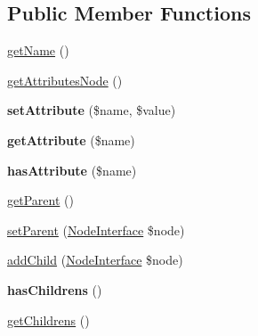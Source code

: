 \subsection*{Public Member Functions}
\begin{DoxyCompactItemize}
\item 
\mbox{\hyperlink{interface_pes_1_1_dom_1_1_node_1_1_node_interface_a3d0963e68bb313b163a73f2803c64600}{get\+Name}} ()
\item 
\mbox{\hyperlink{interface_pes_1_1_dom_1_1_node_1_1_node_interface_a4722e7722b245351681b05d35f6694f3}{get\+Attributes\+Node}} ()
\item 
\mbox{\label{interface_pes_1_1_dom_1_1_node_1_1_node_interface_a545f43e4d937e0e272a4bafe8b411d55}} 
{\bfseries set\+Attribute} (\$name, \$value)
\item 
\mbox{\label{interface_pes_1_1_dom_1_1_node_1_1_node_interface_ae954da422d40fc286691e54679e44c6f}} 
{\bfseries get\+Attribute} (\$name)
\item 
\mbox{\label{interface_pes_1_1_dom_1_1_node_1_1_node_interface_ac78ba27a41d0291c61326022489d4986}} 
{\bfseries has\+Attribute} (\$name)
\item 
\mbox{\hyperlink{interface_pes_1_1_dom_1_1_node_1_1_node_interface_a95ecaee3537b1ad29b04ef383a57bbae}{get\+Parent}} ()
\item 
\mbox{\hyperlink{interface_pes_1_1_dom_1_1_node_1_1_node_interface_a3eb7b224ac469e505363e30fd18d3dbb}{set\+Parent}} (\mbox{\hyperlink{interface_pes_1_1_dom_1_1_node_1_1_node_interface}{Node\+Interface}} \$node)
\item 
\mbox{\hyperlink{interface_pes_1_1_dom_1_1_node_1_1_node_interface_a1d59c3782ba90a94f31ee6c58d86e9fc}{add\+Child}} (\mbox{\hyperlink{interface_pes_1_1_dom_1_1_node_1_1_node_interface}{Node\+Interface}} \$node)
\item 
\mbox{\label{interface_pes_1_1_dom_1_1_node_1_1_node_interface_aba4a4ebb19df879bd02542b85a83bd2f}} 
{\bfseries has\+Childrens} ()
\item 
\mbox{\hyperlink{interface_pes_1_1_dom_1_1_node_1_1_node_interface_a97634dc0a1d163eb272a73543accaa92}{get\+Childrens}} ()
\end{DoxyCompactItemize}


